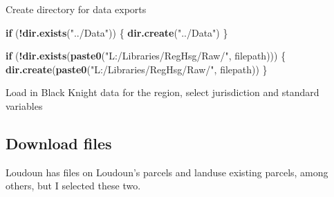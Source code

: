 \documentclass[]{article}
\newenvironment{Shaded}{\begin{snugshade}}{\end{snugshade}}
\newcommand{\KeywordTok}[1]{\textcolor[rgb]{0.13,0.29,0.53}{\textbf{#1}}}
\newcommand{\DataTypeTok}[1]{\textcolor[rgb]{0.13,0.29,0.53}{#1}}
\newcommand{\StringTok}[1]{\textcolor[rgb]{0.31,0.60,0.02}{#1}}
\newcommand{\ControlFlowTok}[1]{\textcolor[rgb]{0.13,0.29,0.53}{\textbf{#1}}}
\newcommand{\OperatorTok}[1]{\textcolor[rgb]{0.81,0.36,0.00}{\textbf{#1}}}
\newcommand{\NormalTok}[1]{#1}
\begin{document}
Create directory for data exports

\begin{Shaded}
\begin{Highlighting}[]
\ControlFlowTok{if}\NormalTok{ (}\OperatorTok{!}\KeywordTok{dir.exists}\NormalTok{(}\StringTok{"../Data"}\NormalTok{)) \{}
  \KeywordTok{dir.create}\NormalTok{(}\StringTok{"../Data"}\NormalTok{)}
\NormalTok{\}}

\ControlFlowTok{if}\NormalTok{ (}\OperatorTok{!}\KeywordTok{dir.exists}\NormalTok{(}\KeywordTok{paste0}\NormalTok{(}\StringTok{"L:/Libraries/RegHsg/Raw/"}\NormalTok{, filepath))) \{}
  \KeywordTok{dir.create}\NormalTok{(}\KeywordTok{paste0}\NormalTok{(}\StringTok{"L:/Libraries/RegHsg/Raw/"}\NormalTok{, filepath))}
\NormalTok{\}}
\end{Highlighting}
\end{Shaded}

Load in Black Knight data for the region, select jurisdiction and
standard variables

\begin{Shaded}
\end{Shaded}

\subsection{Download files}\label{download-files}

Loudoun has files on Loudoun's parcels and landuse existing parcels,
among others, but I selected these two.
\end{document}

